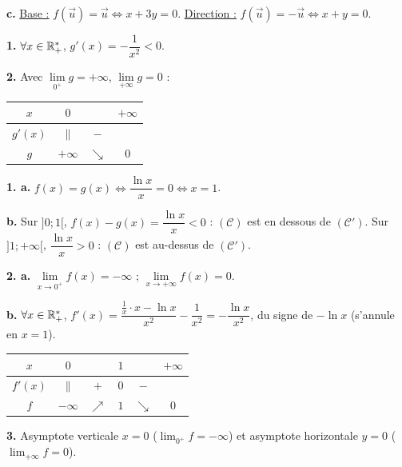 \documentclass[11pt]{article}
\begin{document}
\textbf{c.} \underline{Base :} $f(\vec{u}) = \vec{u} \Leftrightarrow x + 3y = 0$. \underline{Direction :} $f(\vec{u}) = -\vec{u} \Leftrightarrow x + y = 0$.

\textbf{1.} $\forall x \in \mathbb{R}_+^*$, $g'(x) = -\dfrac{1}{x^2} < 0$.

\textbf{2.} Avec $\lim\limits_{0^+} g = +\infty$, $\lim\limits_{+\infty} g = 0$ :
\begin{center}\renewcommand{\arraystretch}{1.4}
\begin{tabular}{|c|ccc|}
\hline $x$ & $0$ & & $+\infty$ \\\hline $g'(x)$ & $\|$ & $-$ & \\\hline $g$ & $+\infty$ & $\searrow$ & $0$ \\\hline
\end{tabular}
\end{center}

\textbf{1. a.} $f(x) = g(x) \Leftrightarrow \dfrac{\ln x}{x} = 0 \Leftrightarrow x = 1$.

\textbf{b.} Sur $]0;1[$, $f(x) - g(x) = \dfrac{\ln x}{x} < 0$ : $(\mathcal{C})$ est en dessous de $(\mathcal{C}')$. Sur $]1;+\infty[$, $\dfrac{\ln x}{x} > 0$ : $(\mathcal{C})$ est au-dessus de $(\mathcal{C}')$.

\textbf{2. a.} $\lim\limits_{x\to 0^+} f(x) = -\infty$ ; $\lim\limits_{x\to+\infty} f(x) = 0$.

\textbf{b.} $\forall x \in \mathbb{R}_+^*$, $f'(x) = \dfrac{\frac{1}{x}\cdot x - \ln x}{x^2} - \dfrac{1}{x^2} = -\dfrac{\ln x}{x^2}$, du signe de $-\ln x$ (s'annule en $x = 1$).
\begin{center}\renewcommand{\arraystretch}{1.4}
\begin{tabular}{|c|ccccc|}
\hline $x$ & $0$ & & $1$ & & $+\infty$ \\\hline $f'(x)$ & $\|$ & $+$ & $0$ & $-$ & \\\hline $f$ & $-\infty$ & $\nearrow$ & $1$ & $\searrow$ & $0$ \\\hline
\end{tabular}
\end{center}

\textbf{3.} Asymptote verticale $x = 0$ ($\lim_{0^+} f = -\infty$) et asymptote horizontale $y = 0$ ($\lim_{+\infty} f = 0$).
\begin{center}
\end{center}
\end{document}
